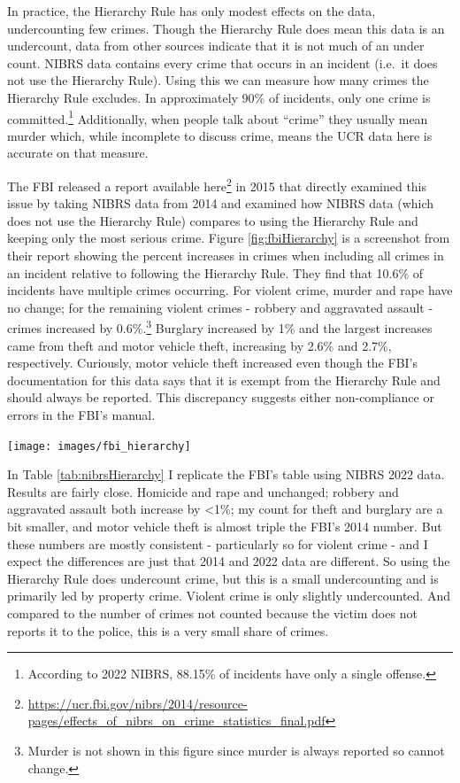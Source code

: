 \documentclass[
]{krantz}
\let\origfigure\figure
\let\endorigfigure\endfigure
\renewenvironment{figure}[1][2] {
    \expandafter\origfigure\expandafter[H]
} {
    \endorigfigure
}
\renewcommand{\href}[2]{#2\footnote{\url{#1}}}
\begin{document}
In practice, the Hierarchy Rule has only modest effects on
the data, undercounting few crimes. Though the Hierarchy
Rule does mean this data is an undercount, data from other
sources indicate that it is not much of an under count.
NIBRS data contains every crime that occurs in an incident
(i.e.~it does not use the Hierarchy Rule). Using this we can
measure how many crimes the Hierarchy Rule excludes. In
approximately 90\% of incidents, only one crime is
committed.\footnote{According to 2022 NIBRS, 88.15\% of
  incidents have only a single offense.} Additionally, when
people talk about ``crime'' they usually mean murder which,
while incomplete to discuss crime, means the UCR data here
is accurate on that measure.

The FBI released a report
\href{https://ucr.fbi.gov/nibrs/2014/resource-pages/effects_of_nibrs_on_crime_statistics_final.pdf}{available
here} in 2015 that directly examined this issue by taking
NIBRS data from 2014 and examined how NIBRS data (which does
not use the Hierarchy Rule) compares to using the Hierarchy
Rule and keeping only the most serious crime. Figure
\ref{fig:fbiHierarchy} is a screenshot from their report
showing the percent increases in crimes when including all
crimes in an incident relative to following the Hierarchy
Rule. They find that 10.6\% of incidents have multiple
crimes occurring. For violent crime, murder and rape have no
change; for the remaining violent crimes - robbery and
aggravated assault - crimes increased by 0.6\%.\footnote{Murder
  is not shown in this figure since murder is always
  reported so cannot change.} Burglary increased by 1\% and
the largest increases came from theft and motor vehicle
theft, increasing by 2.6\% and 2.7\%, respectively.
Curiously, motor vehicle theft increased even though the
FBI's documentation for this data says that it is exempt
from the Hierarchy Rule and should always be reported. This
discrepancy suggests either non-compliance or errors in the
FBI's manual.

\begin{figure}

{\centering \texttt{[image: images/fbi\_hierarchy]} 

}

\caption{The FBI's findings of how crime reporting changes when using the Hierarchy Rule using NIBRS 2014 data.}\label{fig:fbiHierarchy}
\end{figure}

In Table \ref{tab:nibrsHierarchy} I replicate the FBI's
table using NIBRS 2022 data. Results are fairly close.
Homicide and rape and unchanged; robbery and aggravated
assault both increase by \textless1\%; my count for theft
and burglary are a bit smaller, and motor vehicle theft is
almost triple the FBI's 2014 number. But these numbers are
mostly consistent - particularly so for violent crime - and
I expect the differences are just that 2014 and 2022 data
are different. So using the Hierarchy Rule does undercount
crime, but this is a small undercounting and is primarily
led by property crime. Violent crime is only slightly
undercounted. And compared to the number of crimes not
counted because the victim does not reports it to the
police, this is a very small share of crimes.
\end{document}
